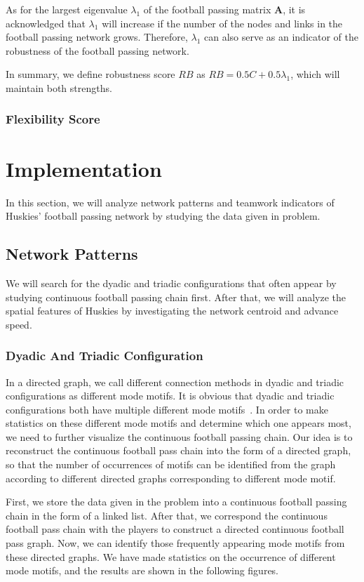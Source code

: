 \documentclass{mcmthesis}
\begin{document}
	As for the largest eigenvalue $\lambda_{1}$ of the football passing matrix $\textbf{A}$, it is acknowledged that $\lambda_{1}$ will increase if the number of the nodes and links in the football passing network grows.  Therefore, $\lambda_{1}$ can also serve as an indicator of the robustness of the football passing network.

	In summary, we define robustness score $RB$ as $RB = 0.5C + 0.5\lambda_{1}$, which will maintain both strengths.
\subsubsection{Flexibility Score}
\section{Implementation}
	In this section, we will analyze network patterns and teamwork indicators of Huskies' football passing network by studying the data given in problem. 
\subsection{Network Patterns}
	We will search for the dyadic and triadic configurations that often appear by studying continuous football passing chain first.  After that, we will analyze the spatial features of Huskies by investigating the network centroid and advance speed.
\subsubsection{Dyadic And Triadic Configuration}
	In a directed graph, we call different connection methods in dyadic and triadic configurations as different mode motifs.  It is obvious that dyadic and triadic configurations both have multiple different mode motifs~\cite{Second}.  In order to make statistics on these different mode motifs and determine which one appears most, we need to further visualize the continuous football passing chain.  Our idea is to reconstruct the continuous football pass chain into the form of a directed graph, so that the number of occurrences of motifs can be identified from the graph according to different directed graphs corresponding to different mode motif.

	First, we store the data given in the problem into a continuous football passing chain in the form of a linked list.  After that, we correspond the continuous football pass chain with the players to construct a directed continuous football pass graph.  Now, we can identify those frequently appearing mode motifs from these directed graphs.  We have made statistics on the occurrence of different mode motifs, and the results are shown in the following figures.
\end{document}
